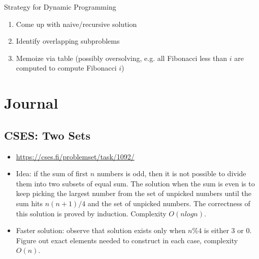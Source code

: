 \documentclass[titlepage, 12pt]{book}
\begin{document}
\begin{definition}{Strategy for Dynamic Programming}{}
    \begin{enumerate}
        \item Come up with naive/recursive solution
        \item Identify overlapping subproblems
        \item Memoize via table (possibly oversolving, e.g. all Fibonacci less
            than $i$ are computed to compute Fibonacci $i$)
    \end{enumerate}
\end{definition}

\chapter{Journal}

\section{CSES: Two Sets}

\begin{itemize}
    \item \url{https://cses.fi/problemset/task/1092/}
    \item Idea: if the sum of first $n$ numbers is odd, then it is not possible to
        divide them into two subsets of equal sum. The solution when the sum is even is
        to keep picking the largest number from the set of unpicked numbers until the
        sum hits $n(n+1)/4$ and the set of unpicked numbers. The correctness of this
        solution is proved by induction. Complexity $O(nlogn)$.
    \item Faster solution: observe that solution exists only when $n\%4$ is
        either 3 or 0. Figure out exact elements needed to construct in each
        case, complexity $O(n)$.
\end{itemize}
\end{document}
